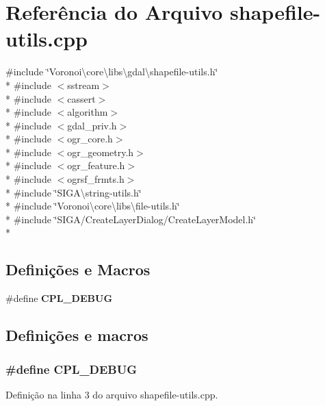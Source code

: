 \section{Referência do Arquivo shapefile-\/utils.cpp}
\label{shapefile-utils_8cpp}
{\ttfamily \#include \char`\"{}Voronoi\textbackslash{}core\textbackslash{}libs\textbackslash{}gdal\textbackslash{}shapefile-\/utils.\+h\char`\"{}}\\*
{\ttfamily \#include $<$sstream$>$}\\*
{\ttfamily \#include $<$cassert$>$}\\*
{\ttfamily \#include $<$algorithm$>$}\\*
{\ttfamily \#include $<$gdal\+\_\+priv.\+h$>$}\\*
{\ttfamily \#include $<$ogr\+\_\+core.\+h$>$}\\*
{\ttfamily \#include $<$ogr\+\_\+geometry.\+h$>$}\\*
{\ttfamily \#include $<$ogr\+\_\+feature.\+h$>$}\\*
{\ttfamily \#include $<$ogrsf\+\_\+frmts.\+h$>$}\\*
{\ttfamily \#include \char`\"{}S\+I\+G\+A\textbackslash{}string-\/utils.\+h\char`\"{}}\\*
{\ttfamily \#include \char`\"{}Voronoi\textbackslash{}core\textbackslash{}libs\textbackslash{}file-\/utils.\+h\char`\"{}}\\*
{\ttfamily \#include \char`\"{}S\+I\+G\+A/\+Create\+Layer\+Dialog/\+Create\+Layer\+Model.\+h\char`\"{}}\\*
\subsection*{Definições e Macros}
\begin{DoxyCompactItemize}
\item 
\#define {\bf C\+P\+L\+\_\+\+D\+E\+B\+UG}
\end{DoxyCompactItemize}


\subsection{Definições e macros}
\subsubsection[{C\+P\+L\+\_\+\+D\+E\+B\+UG}]{\setlength{\rightskip}{0pt plus 5cm}\#define C\+P\+L\+\_\+\+D\+E\+B\+UG}\label{shapefile-utils_8cpp_a30f078c0d87077222c21c4a36c84432a}


Definição na linha 3 do arquivo shapefile-\/utils.\+cpp.

